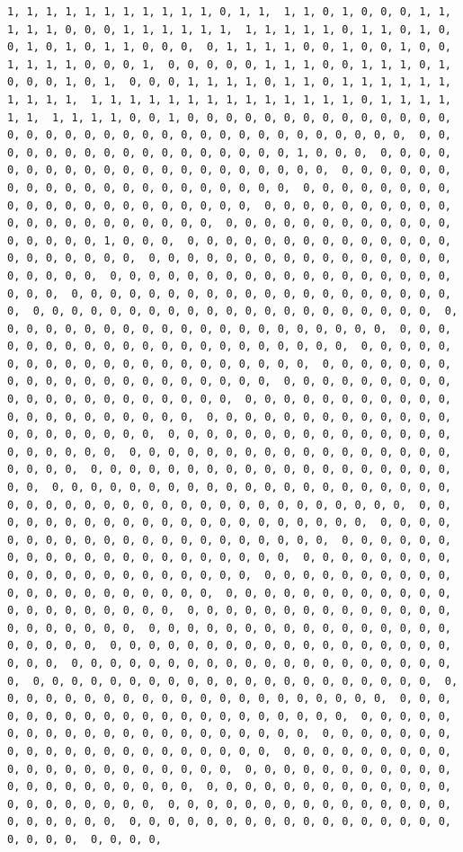 \documentclass[
]{article}
\begin{document}
\begin{verbatim}
1, 1, 1, 1, 1, 1, 1, 1, 1, 1, 1, 0, 1, 1,  1, 1, 0, 1, 0, 0, 0, 1, 1, 1, 1, 1, 0, 0, 0, 1, 1, 1, 1, 1, 1,  1, 1, 1, 1, 1, 0, 1, 1, 0, 1, 0, 0, 1, 0, 1, 0, 1, 1, 0, 0, 0,  0, 1, 1, 1, 1, 0, 0, 1, 0, 0, 1, 0, 0, 1, 1, 1, 1, 0, 0, 0, 1,  0, 0, 0, 0, 0, 1, 1, 1, 0, 0, 1, 1, 1, 0, 1, 0, 0, 0, 1, 0, 1,  0, 0, 0, 1, 1, 1, 1, 0, 1, 1, 0, 1, 1, 1, 1, 1, 1, 1, 1, 1, 1,  1, 1, 1, 1, 1, 1, 1, 1, 1, 1, 1, 1, 1, 1, 0, 1, 1, 1, 1, 1, 1,  1, 1, 1, 1, 0, 0, 1, 0, 0, 0, 0, 0, 0, 0, 0, 0, 0, 0, 0, 0, 0,  0, 0, 0, 0, 0, 0, 0, 0, 0, 0, 0, 0, 0, 0, 0, 0, 0, 0, 0, 0, 0,  0, 0, 0, 0, 0, 0, 0, 0, 0, 0, 0, 0, 0, 0, 0, 0, 0, 1, 0, 0, 0,  0, 0, 0, 0, 0, 0, 0, 0, 0, 0, 0, 0, 0, 0, 0, 0, 0, 0, 0, 0, 0,  0, 0, 0, 0, 0, 0, 0, 0, 0, 0, 0, 0, 0, 0, 0, 0, 0, 0, 0, 0, 0,  0, 0, 0, 0, 0, 0, 0, 0, 0, 0, 0, 0, 0, 0, 0, 0, 0, 0, 0, 0, 0,  0, 0, 0, 0, 0, 0, 0, 0, 0, 0, 0, 0, 0, 0, 0, 0, 0, 0, 0, 0, 0,  0, 0, 0, 0, 0, 0, 0, 0, 0, 0, 0, 0, 0, 0, 0, 0, 0, 1, 0, 0, 0,  0, 0, 0, 0, 0, 0, 0, 0, 0, 0, 0, 0, 0, 0, 0, 0, 0, 0, 0, 0, 0,  0, 0, 0, 0, 0, 0, 0, 0, 0, 0, 0, 0, 0, 0, 0, 0, 0, 0, 0, 0, 0,  0, 0, 0, 0, 0, 0, 0, 0, 0, 0, 0, 0, 0, 0, 0, 0, 0, 0, 0, 0, 0,  0, 0, 0, 0, 0, 0, 0, 0, 0, 0, 0, 0, 0, 0, 0, 0, 0, 0, 0, 0, 0,  0, 0, 0, 0, 0, 0, 0, 0, 0, 0, 0, 0, 0, 0, 0, 0, 0, 0, 0, 0, 0,  0, 0, 0, 0, 0, 0, 0, 0, 0, 0, 0, 0, 0, 0, 0, 0, 0, 0, 0, 0, 0,  0, 0, 0, 0, 0, 0, 0, 0, 0, 0, 0, 0, 0, 0, 0, 0, 0, 0, 0, 0, 0,  0, 0, 0, 0, 0, 0, 0, 0, 0, 0, 0, 0, 0, 0, 0, 0, 0, 0, 0, 0, 0,  0, 0, 0, 0, 0, 0, 0, 0, 0, 0, 0, 0, 0, 0, 0, 0, 0, 0, 0, 0, 0,  0, 0, 0, 0, 0, 0, 0, 0, 0, 0, 0, 0, 0, 0, 0, 0, 0, 0, 0, 0, 0,  0, 0, 0, 0, 0, 0, 0, 0, 0, 0, 0, 0, 0, 0, 0, 0, 0, 0, 0, 0, 0,  0, 0, 0, 0, 0, 0, 0, 0, 0, 0, 0, 0, 0, 0, 0, 0, 0, 0, 0, 0, 0,  0, 0, 0, 0, 0, 0, 0, 0, 0, 0, 0, 0, 0, 0, 0, 0, 0, 0, 0, 0, 0,  0, 0, 0, 0, 0, 0, 0, 0, 0, 0, 0, 0, 0, 0, 0, 0, 0, 0, 0, 0, 0,  0, 0, 0, 0, 0, 0, 0, 0, 0, 0, 0, 0, 0, 0, 0, 0, 0, 0, 0, 0, 0,  0, 0, 0, 0, 0, 0, 0, 0, 0, 0, 0, 0, 0, 0, 0, 0, 0, 0, 0, 0, 0,  0, 0, 0, 0, 0, 0, 0, 0, 0, 0, 0, 0, 0, 0, 0, 0, 0, 0, 0, 0, 0,  0, 0, 0, 0, 0, 0, 0, 0, 0, 0, 0, 0, 0, 0, 0, 0, 0, 0, 0, 0, 0,  0, 0, 0, 0, 0, 0, 0, 0, 0, 0, 0, 0, 0, 0, 0, 0, 0, 0, 0, 0, 0,  0, 0, 0, 0, 0, 0, 0, 0, 0, 0, 0, 0, 0, 0, 0, 0, 0, 0, 0, 0, 0,  0, 0, 0, 0, 0, 0, 0, 0, 0, 0, 0, 0, 0, 0, 0, 0, 0, 0, 0, 0, 0,  0, 0, 0, 0, 0, 0, 0, 0, 0, 0, 0, 0, 0, 0, 0, 0, 0, 0, 0, 0, 0,  0, 0, 0, 0, 0, 0, 0, 0, 0, 0, 0, 0, 0, 0, 0, 0, 0, 0, 0, 0, 0,  0, 0, 0, 0, 0, 0, 0, 0, 0, 0, 0, 0, 0, 0, 0, 0, 0, 0, 0, 0, 0,  0, 0, 0, 0, 0, 0, 0, 0, 0, 0, 0, 0, 0, 0, 0, 0, 0, 0, 0, 0, 0,  0, 0, 0, 0, 0, 0, 0, 0, 0, 0, 0, 0, 0, 0, 0, 0, 0, 0, 0, 0, 0,  0, 0, 0, 0, 0, 0, 0, 0, 0, 0, 0, 0, 0, 0, 0, 0, 0, 0, 0, 0, 0,  0, 0, 0, 0, 0, 0, 0, 0, 0, 0, 0, 0, 0, 0, 0, 0, 0, 0, 0, 0, 0,  0, 0, 0, 0, 0, 0, 0, 0, 0, 0, 0, 0, 0, 0, 0, 0, 0, 0, 0, 0, 0,  0, 0, 0, 0, 0, 0, 0, 0, 0, 0, 0, 0, 0, 0, 0, 0, 0, 0, 0, 0, 0,  0, 0, 0, 0, 0, 0, 0, 0, 0, 0, 0, 0, 0, 0, 0, 0, 0, 0, 0, 0, 0,  0, 0, 0, 0, 0, 0, 0, 0, 0, 0, 0, 0, 0, 0, 0, 0, 0, 0, 0, 0, 0,  0, 0, 0, 0, 0, 0, 0, 0, 0, 0, 0, 0, 0, 0, 0, 0, 0, 0, 0, 0, 0,  0, 0, 0, 0, 0, 0, 0, 0, 0, 0, 0, 0, 0, 0, 0, 0, 0, 0, 0, 0, 0,  0, 0, 0, 0, 0, 0, 0, 0, 0, 0, 0, 0, 0, 0, 0, 0, 0, 0, 0, 0, 0,  0, 0, 0, 0, 0, 0, 0, 0, 0, 0, 0, 0, 0, 0, 0, 0, 0, 0, 0, 0, 0,  0, 0, 0, 0, 0, 0, 0, 0, 0, 0, 0, 0, 0, 0, 0, 0, 0, 0, 0, 0, 0,  0, 0, 0, 0, 
\end{verbatim}
\end{document}
